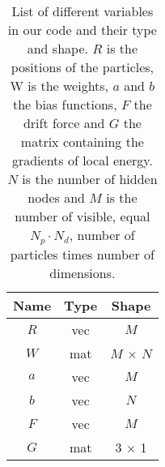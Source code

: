 \begin{table}
    \centering
    \begin{tabular}{|c|c|c|}
    \hline
    Name   &  Type   &   Shape \\
    \hline
    $R$ & vec & $M$ \\
    $W$ & mat & $M$ $\times$ $N$ \\
    $a$ & vec & $M$ \\
    $b$ & vec & $N$ \\
    $F$ & vec & $M$ \\
    $G$ & mat & 3 $\times$ 1 \\
    \hline
    \end{tabular}
    \caption{List of different variables in our code and their type and shape. $R$ is the positions of the particles, W is the weights, $a$ and $b$ the bias functions, $F$ the drift force and $G$ the matrix containing the gradients of local energy. $N$ is the number of hidden nodes and $M$ is the number of visible, equal $N_p \cdot N_d$, number of particles times number of dimensions.}
    \label{tab:variables}
\end{table} 